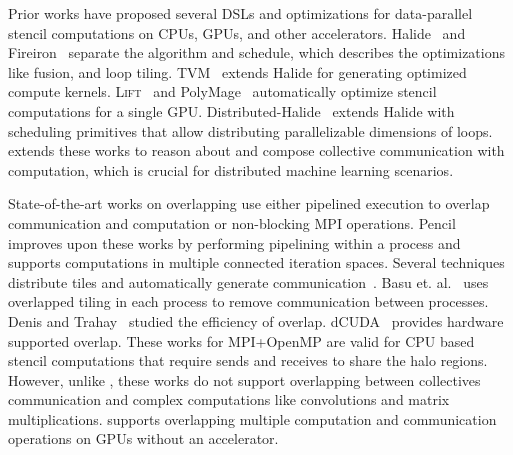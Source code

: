 Prior works have proposed several DSLs and optimizations for data-parallel stencil computations on CPUs, GPUs, and other accelerators.
Halide~\cite{halide} and Fireiron~\cite{fireiron} separate the algorithm and schedule, which describes the optimizations like fusion, and loop tiling.
TVM~\cite{tvm18} extends Halide for generating optimized compute kernels. 
\textsc{Lift}~\cite{lift-cgo18,lift-cgo17} and PolyMage~\cite{polymage-gpu} automatically optimize stencil computations for a single GPU.
Distributed-Halide~\cite{distributed-halide} extends Halide with scheduling primitives that allow distributing parallelizable dimensions of loops.
\tool extends these works to reason about and compose collective communication with computation, which is crucial for distributed machine learning scenarios.

State-of-the-art works on overlapping \cite{Barigou2017, KOZIRIS20031138,7336201,10.1145/1810085.1810091,10.1007/978-3-319-58667-0_18} use either pipelined execution to overlap communication and computation or non-blocking MPI operations.
Pencil~\cite{sc20:pencil} improves upon these works by performing pipelining within a process and supports computations in multiple connected iteration spaces.
Several techniques distribute tiles and automatically generate communication~\cite{10.1145/2503210.2503289, distributed-halide,8121995}.
Basu et. al.~\cite{6799131} uses overlapped tiling in each process to remove communication between processes.
Denis and Trahay~\cite{7573826} studied the efficiency of overlap.
dCUDA~\cite{dcuda} provides hardware supported overlap.
These works for MPI+OpenMP are valid for CPU based stencil computations that require sends and receives to share the halo regions.
However, unlike \tool, these works do not support overlapping between collectives communication and complex computations like convolutions and matrix multiplications.
\tool supports overlapping multiple computation and communication operations on GPUs without an accelerator.

